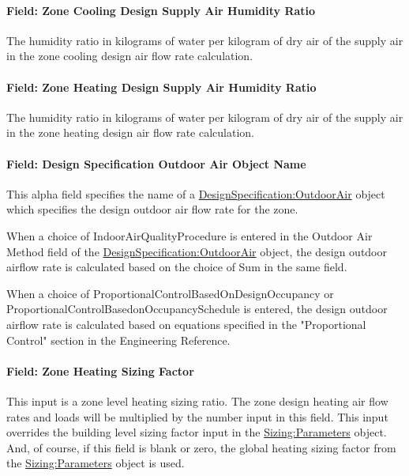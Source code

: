 \paragraph{Field: Zone Cooling Design Supply Air Humidity Ratio}\label{field-zone-cooling-design-supply-air-humidity-ratio}

The humidity ratio in kilograms of water per kilogram of dry air of the supply air in the zone cooling design air flow rate calculation.

\paragraph{Field: Zone Heating Design Supply Air Humidity Ratio}\label{field-zone-heating-design-supply-air-humidity-ratio}

The humidity ratio in kilograms of water per kilogram of dry air of the supply air in the zone heating design air flow rate calculation.

\paragraph{Field: Design Specification Outdoor Air Object Name}\label{field-design-specification-outdoor-air-object-name-000}

This alpha field specifies the name of a \hyperref[designspecificationoutdoorair]{DesignSpecification:OutdoorAir} object which specifies the design outdoor air flow rate for the zone.

When a choice of IndoorAirQualityProcedure is entered in the Outdoor Air Method field of the \hyperref[designspecificationoutdoorair]{DesignSpecification:OutdoorAir} object, the design outdoor airflow rate is calculated based on the choice of Sum in the same field.

When a choice of ProportionalControlBasedOnDesignOccupancy or ProportionalControlBasedonOccupancySchedule is entered, the design outdoor airflow rate is calculated based on equations specified in the "Proportional Control" section in the Engineering Reference.

\paragraph{Field: Zone Heating Sizing Factor}\label{field-zone-heating-sizing-factor}

This input is a zone level heating sizing ratio. The zone design heating air flow rates and loads will be multiplied by the number input in this field. This input overrides the building level sizing factor input in the \hyperref[sizingparameters]{Sizing:Parameters} object. And, of course, if this field is blank or zero, the global heating sizing factor from the \hyperref[sizingparameters]{Sizing:Parameters} object is used.

